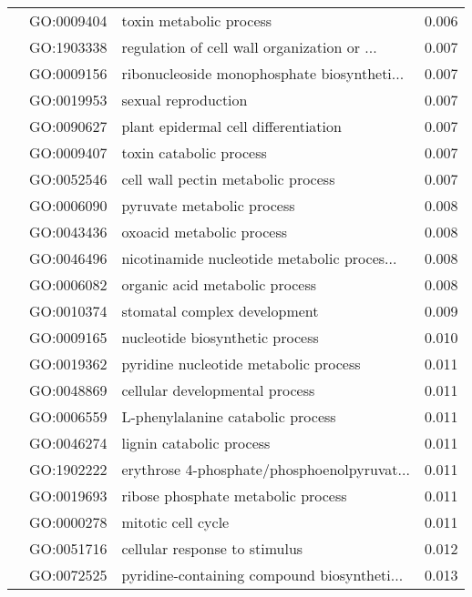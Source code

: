 \begin{longtable}{lllr}
   & GO:0009404 &                      toxin metabolic process &         0.006 \\
   & GO:1903338 &  regulation of cell wall organization or ... &         0.007 \\
   & GO:0009156 &  ribonucleoside monophosphate biosyntheti... &         0.007 \\
   & GO:0019953 &                          sexual reproduction &         0.007 \\
   & GO:0090627 &         plant epidermal cell differentiation &         0.007 \\
   & GO:0009407 &                      toxin catabolic process &         0.007 \\
   & GO:0052546 &           cell wall pectin metabolic process &         0.007 \\
   & GO:0006090 &                   pyruvate metabolic process &         0.008 \\
   & GO:0043436 &                    oxoacid metabolic process &         0.008 \\
   & GO:0046496 &  nicotinamide nucleotide metabolic proces... &         0.008 \\
   & GO:0006082 &               organic acid metabolic process &         0.008 \\
   & GO:0010374 &                 stomatal complex development &         0.009 \\
   & GO:0009165 &              nucleotide biosynthetic process &         0.010 \\
   & GO:0019362 &        pyridine nucleotide metabolic process &         0.011 \\
   & GO:0048869 &               cellular developmental process &         0.011 \\
   & GO:0006559 &            L-phenylalanine catabolic process &         0.011 \\
   & GO:0046274 &                     lignin catabolic process &         0.011 \\
   & GO:1902222 &  erythrose 4-phosphate/phosphoenolpyruvat... &         0.011 \\
   & GO:0019693 &           ribose phosphate metabolic process &         0.011 \\
   & GO:0000278 &                           mitotic cell cycle &         0.011 \\
   & GO:0051716 &                cellular response to stimulus &         0.012 \\
   & GO:0072525 &  pyridine-containing compound biosyntheti... &         0.013 \\

\end{longtable}
